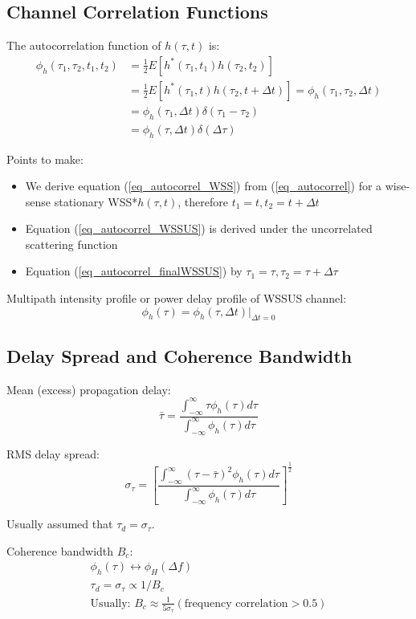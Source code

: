 \subsection{Channel Correlation Functions}
The autocorrelation function of $h(\tau,t)$ is:
\begin{align}
    \phi_h(\tau_1,\tau_2,t_1,t_2) &= \frac{1}{2} E \left[ h^*(\tau_1,t_1) h(\tau_2,t_2) \right] \label{eq_autocorrel} \\
    &= \frac{1}{2} E \left[ h^*(\tau_1,t) h(\tau_2, t+\Delta t) \right] = \phi_h(\tau_1,\tau_2,\Delta t) \label{eq_autocorrel_WSS}\\
    &= \phi_h (\tau_1,\Delta t) \delta(\tau_1 - \tau_2) \label{eq_autocorrel_WSSUS}\\
    &= \phi_h (\tau,\Delta t) \delta(\Delta\tau) \label{eq_autocorrel_finalWSSUS}
\end{align}

Points to make:
\begin{itemize}
    \item We derive equation (\ref{eq_autocorrel_WSS}) from (\ref{eq_autocorrel}) for a wise-sense stationary WSS*$h(\tau,t)$, therefore $t_1 = t, t_2 = t + \Delta t$
    \item Equation (\ref{eq_autocorrel_WSSUS}) is derived under the uncorrelated scattering function
    \item Equation (\ref{eq_autocorrel_finalWSSUS}) by $\tau_1 = \tau, \tau_2 = \tau + \Delta\tau$
\end{itemize}

Multipath intensity profile or power delay profile of WSSUS channel:
\begin{equation}
    \phi_h(\tau) = \phi_h(\tau,\Delta t)|_{\Delta t = 0}
\end{equation}

\subsection{Delay Spread and Coherence Bandwidth}
Mean (excess) propagation delay:
\begin{equation}
    \bar{\tau} = \frac
    {\int_{-\infty}^\infty \tau \phi_h(\tau) d\tau}
    {\int_{-\infty}^\infty \phi_h(\tau) d\tau}
\end{equation}

RMS delay spread:
\begin{equation}
    \sigma_\tau = \left[ \frac
    {\int_{-\infty}^\infty (\tau - \bar{\tau})^2 \phi_h(\tau) d \tau}
    {\int_{-\infty}^\infty \phi_h(\tau) d \tau}
    \right]^\frac{1}{2}
\end{equation}

Usually assumed that $\tau_d = \sigma_\tau$.

Coherence bandwidth $B_c$:
\begin{gather}
    \phi_h(\tau) \leftrightarrow \phi_H(\Delta f) \\
    \tau_d = \sigma_\tau \propto 1/B_c \\
    \text{Usually: } B_c \approx \frac{1}{5 \sigma_\tau} (\text{frequency correlation} > 0.5)
\end{gather}